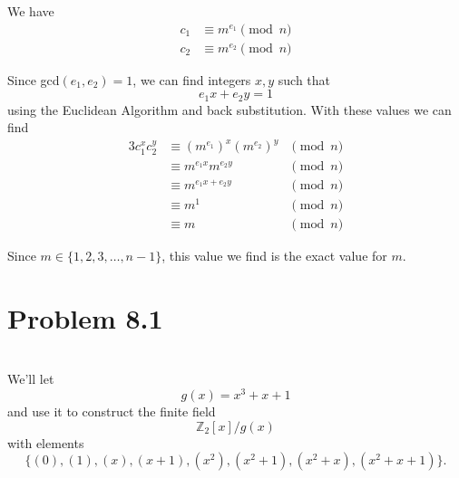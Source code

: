 \documentclass[12pt]{article}
\newcommand{\Z}{\mathbb{Z}}
\begin{document}
We have
\begin{align*}
    c_1 &\equiv m^{e_1} \pmod{n} \\
    c_2 &\equiv m^{e_2} \pmod{n}
\end{align*}

Since gcd$(e_1, e_2)=1$, we can find integers $x,y$ such that
\[e_1x + e_2y = 1\]
using the Euclidean Algorithm and back substitution. With these values we can find
\begin{alignat*}{3}
    c_1^xc_2^y &\equiv (m^{e_1})^x(m^{e_2})^y &\pmod{n} \\
               &\equiv m^{e_1x}m^{e_2y} &\pmod{n} \\
               &\equiv m^{e_1x + e_2y} &\pmod{n} \\
               &\equiv m^1 &\pmod{n} \\
               &\equiv m &\pmod{n}
\end{alignat*}

Since $m \in \{1,2,3,\dots,n-1\}$, this value we find is the exact value for $m$.

\newpage
\section*{Problem 8.1}
\\


We'll let
\[g(x) = x^3 + x + 1\]
and use it to construct the finite field
\[\Z_2[x]/g(x)\]
with elements
\[\{(0),(1),(x),(x+1),(x^2),(x^2+1),(x^2+x),(x^2+x+1)\}.\]
\end{document}

